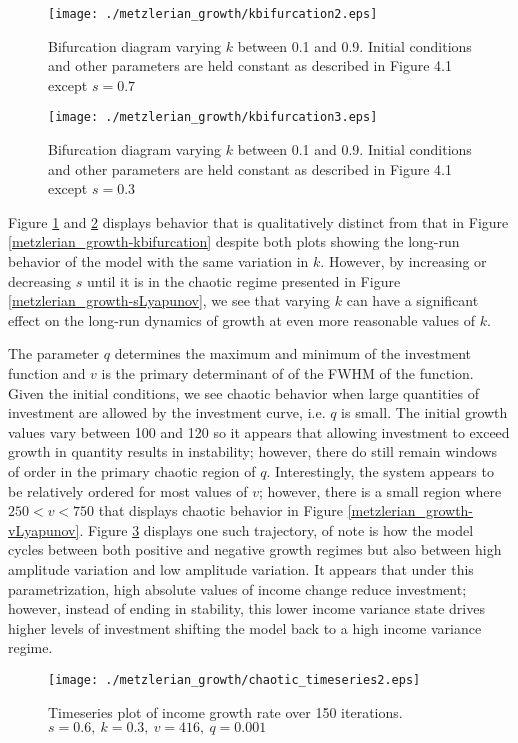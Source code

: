 \begin{figure}
    \centering
    \texttt{[image: ./metzlerian\_growth/kbifurcation2.eps]}
    \caption{Bifurcation diagram varying $k$ between 0.1 and 0.9. Initial conditions and other parameters are held constant as described in Figure 4.1 except $s=0.7$}
    \label{metzlerian_growth-kbifurcation2}
\end{figure}
\begin{figure}
    \centering
    \texttt{[image: ./metzlerian\_growth/kbifurcation3.eps]}
    \caption{Bifurcation diagram varying $k$ between 0.1 and 0.9. Initial conditions and other parameters are held constant as described in Figure 4.1 except $s=0.3$}
    \label{metzlerian_growth-kbifurcation3}
\end{figure}
Figure \ref{metzlerian_growth-kbifurcation2} and \ref{metzlerian_growth-kbifurcation3} displays behavior that is qualitatively distinct from that in Figure \ref{metzlerian_growth-kbifurcation} despite both plots showing the long-run behavior of the model with the same variation in $k$. However, by increasing or decreasing $s$ until it is in the chaotic regime presented in Figure \ref{metzlerian_growth-sLyapunov}, we see that varying $k$ can have a significant effect on the long-run dynamics of growth at even more reasonable values of $k$.

The parameter $q$ determines the maximum and minimum of the investment function and $v$ is the primary determinant of of the FWHM of the function. Given the initial conditions, we see chaotic behavior when large quantities of investment are allowed by the investment curve, i.e. $q$ is small. The initial growth values vary between 100 and 120 so it appears that allowing investment to exceed growth in quantity results in instability;  however, there do still remain windows of order in the primary chaotic region of $q$. Interestingly, the system appears to be relatively ordered for most values of $v$; however, there is a small region where $250<v<750$ that displays chaotic behavior in Figure \ref{metzlerian_growth-vLyapunov}. Figure \ref{metzlerian_growth-chaotic_timeseries2} displays one such trajectory, of note is how the model cycles between both positive and negative growth regimes but also between high amplitude variation and low amplitude variation. It appears that under this parametrization, high absolute values of income change reduce investment; however, instead of ending in stability, this lower income variance state drives higher levels of investment shifting the model back to a high income variance regime.
\begin{figure}
    \centering
    \texttt{[image: ./metzlerian\_growth/chaotic\_timeseries2.eps]}
    \caption{Timeseries plot of income growth rate over 150 iterations. $s=0.6,\ k=0.3,\ v=416,\ q=0.001$}
    \label{metzlerian_growth-chaotic_timeseries2}
\end{figure}

